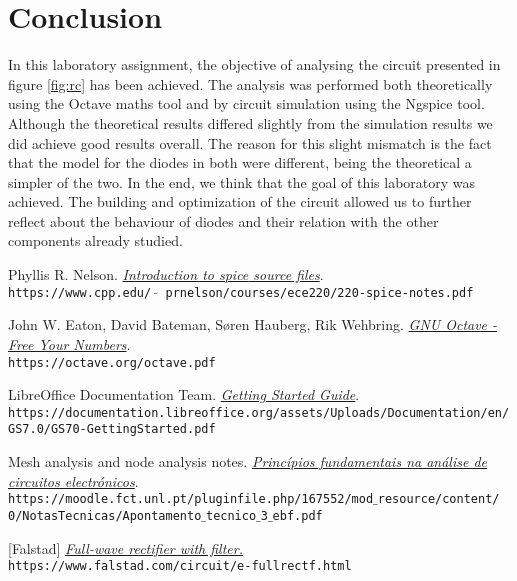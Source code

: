 \clearpage

\section{Conclusion}
\label{sec:conclusion}

In this laboratory assignment, the objective of analysing the circuit presented
in figure \ref{fig:rc} has been achieved. The analysis was performed both theoretically
using the Octave maths tool and by circuit simulation using the Ngspice tool.
Although the theoretical results differed slightly from the simulation results we did achieve good results overall.
The reason for this slight mismatch is the fact that the model for the diodes
in both were different, being the theoretical a simpler of the two.
In the end, we think that the goal of this laboratory was achieved. The building and optimization
of the circuit allowed us to further reflect about the behaviour of diodes and their relation with the other components already studied.


\begin{thebibliography}{9}

    Phyllis R. Nelson.
    \textit{\href{https://www.cpp.edu/~prnelson/courses/ece220/220-spice-notes.pdf}{Introduction to \emph{spice} source files}}.
    \\\texttt{https://www.cpp.edu/ $\tilde{}$ prnelson/courses/ece220/220-spice-notes.pdf}


    John W. Eaton, David Bateman, Søren Hauberg, Rik Wehbring.
    \textit{\href{https://octave.org/octave.pdf}{GNU Octave - Free Your Numbers}}.
    \\\texttt{https://octave.org/octave.pdf}

    LibreOffice Documentation Team.
    \textit{\href{https://documentation.libreoffice.org/assets/Uploads/Documentation/en/GS7.0/GS70-GettingStarted.pdf}{Getting Started Guide}}.
    \\\texttt{https://documentation.libreoffice.org/assets/Uploads/Documentation/en/
        GS7.0/GS70-GettingStarted.pdf}

    Mesh analysis and node analysis notes.
    \textit{\href{https://moodle.fct.unl.pt/pluginfile.php/167552/mod_resource/content/0/NotasTecnicas/Apontamento_tecnico_3_ebf.pdf}{Princípios fundamentais na análise de circuitos electrónicos}}.
    \\\texttt{https://moodle.fct.unl.pt/pluginfile.php/167552/mod$\_$resource/content/
        0/NotasTecnicas/Apontamento$\_$tecnico$\_$3$\_$ebf.pdf}

    [Falstad]
    \textit{\href{https://www.falstad.com/circuit/e-fullrectf.html}{Full-wave rectifier with filter.}}
    \\\texttt{https://www.falstad.com/circuit/e-fullrectf.html}

\end{thebibliography}
